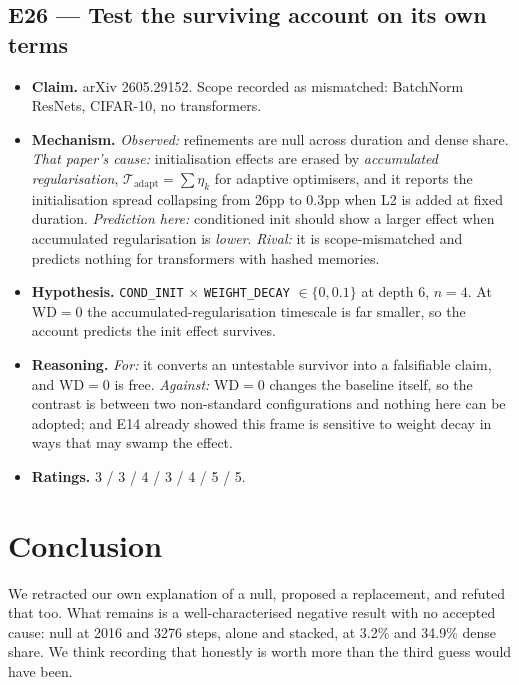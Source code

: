 \documentclass{article}
\begin{document}
\subsection{E26 --- Test the surviving account on its own terms}
\begin{itemize}\itemsep2pt
\item \textbf{Claim.} arXiv 2605.29152. Scope recorded as mismatched: BatchNorm ResNets, CIFAR-10, no transformers.
\item \textbf{Mechanism.} \emph{Observed:} refinements are null across duration and dense share. \emph{That paper's cause:} initialisation effects are erased by \emph{accumulated regularisation}, $\mathcal{T}_{\mathrm{adapt}} = \sum \eta_k$ for adaptive optimisers, and it reports the initialisation spread collapsing from 26pp to 0.3pp when L2 is added at fixed duration. \emph{Prediction here:} conditioned init should show a larger effect when accumulated regularisation is \emph{lower}. \emph{Rival:} it is scope-mismatched and predicts nothing for transformers with hashed memories.
\item \textbf{Hypothesis.} \texttt{COND\_INIT} $\times$ \texttt{WEIGHT\_DECAY} $\in \{0, 0.1\}$ at depth 6, $n{=}4$. At WD${=}0$ the accumulated-regularisation timescale is far smaller, so the account predicts the init effect survives.
\item \textbf{Reasoning.} \emph{For:} it converts an untestable survivor into a falsifiable claim, and WD${=}0$ is free. \emph{Against:} WD${=}0$ changes the baseline itself, so the contrast is between two non-standard configurations and nothing here can be adopted; and E14 already showed this frame is sensitive to weight decay in ways that may swamp the effect.
\item \textbf{Ratings.} 3 / 3 / 4 / 3 / 4 / 5 / 5.
\end{itemize}

\section{Conclusion}
We retracted our own explanation of a null, proposed a replacement, and refuted that too. What remains is a well-characterised negative result with no accepted cause: null at 2016 and 3276 steps, alone and stacked, at 3.2\% and 34.9\% dense share. We think recording that honestly is worth more than the third guess would have been.
\end{document}

